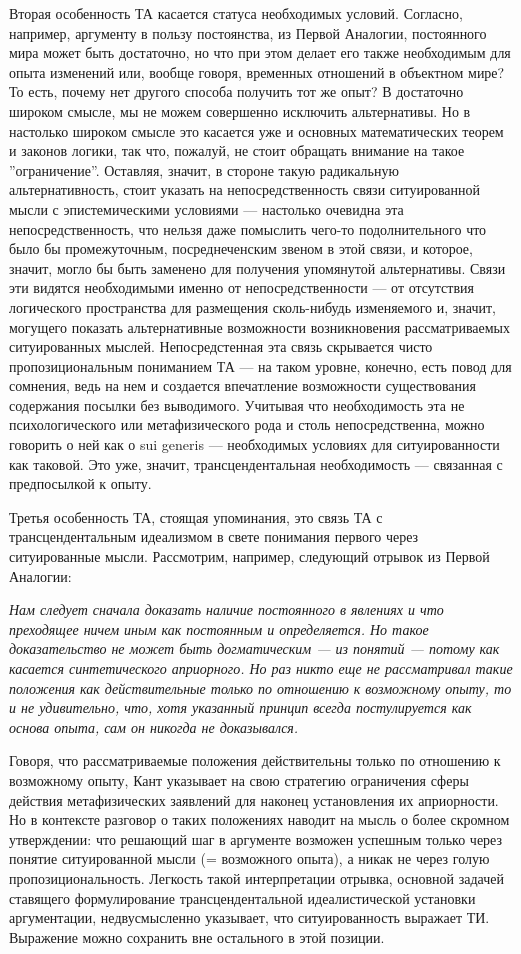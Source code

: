 \documentclass{article}
\begin{document}
Вторая особенность ТА касается статуса необходимых условий. Согласно, например, аргументу в пользу постоянства, из Первой Аналогии, постоянного мира может быть достаточно, но что при этом делает его также необходимым для опыта изменений или, вообще говоря, временных отношений в объектном мире? То есть, почему нет другого способа получить тот же опыт? В достаточно широком смысле, мы не можем совершенно исключить альтернативы. Но в настолько широком смысле это касается уже и основных математических теорем и законов логики, так что, пожалуй, не стоит обращать внимание на такое ''ограничение''. Оставляя, значит, в стороне такую радикальную альтернативность, стоит указать на непосредственность связи ситуированной мысли с эпистемическими условиями — настолько очевидна эта непосредственность, что нельзя даже помыслить чего-то подолнительного что было бы промежуточным, посреднеченским звеном в этой связи, и которое, значит, могло бы быть заменено для получения упомянутой альтернативы. Связи эти видятся необходимыми именно от непосредственности — от отсутствия логического пространства для размещения сколь-нибудь изменяемого и, значит, могущего показать альтернативные возможности возникновения рассматриваемых ситуированных мыслей. Непосредстенная эта связь скрывается чисто пропозициональным пониманием ТА — на таком уровне, конечно, есть повод для сомнения, ведь на нем и создается впечатление возможности существования содержания посылки без выводимого. Учитывая что необходимость эта не психологического или метафизического рода и столь непосредственна, можно говорить о ней как о sui generis — необходимых условиях для ситуированности как таковой. Это уже, значит, трансцендентальная необходимость — связанная с предпосылкой к опыту.

Третья особенность ТА, стоящая упоминания, это связь ТА с трансцендентальным идеализмом в свете понимания первого через ситуированные мысли. Рассмотрим, например, следующий отрывок из Первой Аналогии:

\textit{Нам следует сначала доказать наличие постоянного в явлениях и что преходящее ничем иным как постоянным и определяется. Но такое доказательство не может быть догматическим — из понятий — потому как касается синтетического априорного. Но раз никто еще не рассматривал такие положения как действительные только по отношению к возможному опыту, то и не удивительно, что, хотя указанный принцип всегда постулируется как основа опыта, сам он никогда не доказывался.}

Говоря, что рассматриваемые положения действительны только по отношению к возможному опыту, Кант указывает на свою стратегию ограничения сферы действия метафизических заявлений для наконец установления их априорности. Но в контексте разговор о таких положениях наводит на мысль о более скромном утверждении: что решающий шаг в аргументе возможен успешным только через понятие ситуированной мысли (= возможного опыта), а никак не через голую пропозициональность. Легкость такой интерпретации отрывка, основной задачей ставящего формулирование трансцендентальной идеалистической установки аргументации, недвусмысленно указывает, что ситуированность выражает ТИ. Выражение можно сохранить вне остального в этой позиции.
\end{document}
